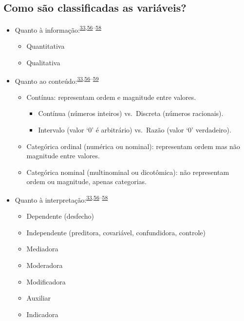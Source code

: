 \documentclass[
  a4paper,
]{book}
\begin{document}
\hypertarget{como-suxe3o-classificadas-as-variuxe1veis}{%
\subsection{Como são classificadas as variáveis?}\label{como-suxe3o-classificadas-as-variuxe1veis}}

\begin{itemize}
\item
  Quanto à informação:\textsuperscript{\protect\hyperlink{ref-vetter2017}{33},\protect\hyperlink{ref-Ali2016}{56}--\protect\hyperlink{ref-kaliyadan2019}{58}}

  \begin{itemize}
  \item
    Quantitativa
  \item
    Qualitativa
  \end{itemize}
\item
  Quanto ao conteúdo:\textsuperscript{\protect\hyperlink{ref-vetter2017}{33},\protect\hyperlink{ref-Ali2016}{56}--\protect\hyperlink{ref-barkan2015}{59}}

  \begin{itemize}
  \item
    Contínua: representam ordem e magnitude entre valores.

    \begin{itemize}
    \item
      Contínua (números inteiros) vs.~Discreta (números racionais).
    \item
      Intervalo (valor `0' é arbitrário) vs.~Razão (valor `0' verdadeiro).
    \end{itemize}
  \item
    Categórica ordinal (numérica ou nominal): representam ordem mas não magnitude entre valores.
  \item
    Categórica nominal (multinominal ou dicotômica): não representam ordem ou magnitude, apenas categorias.
  \end{itemize}
\item
  Quanto à interpretação:\textsuperscript{\protect\hyperlink{ref-vetter2017}{33},\protect\hyperlink{ref-Ali2016}{56}--\protect\hyperlink{ref-kaliyadan2019}{58}}

  \begin{itemize}
  \item
    Dependente (desfecho)
  \item
    Independente (preditora, covariável, confundidora, controle)
  \item
    Mediadora
  \item
    Moderadora
  \item
    Modificadora
  \item
    Auxiliar
  \item
    Indicadora
  \end{itemize}
\end{itemize}
\end{document}
